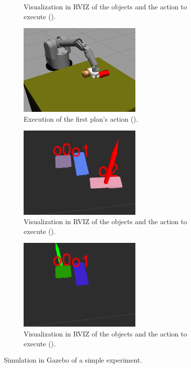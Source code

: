 \begin{figure}
\begin{subfigure}[h]{0.45\textwidth}
\caption{Visualization in RVIZ of the objects and the action to execute ().}
\label{fig:sim_rviz}
\end{subfigure}
\begin{subfigure}[h]{0.45\textwidth}
\centering
\includegraphics[width=6cm]{Img/simulation/pushing.png}
\caption{Execution of the first plan's action ().}\label{fig:sim_push}
\end{subfigure}
\begin{subfigure}[h]{0.45\textwidth}
\centering
\includegraphics[width=6cm]{Img/simulation/action2.png}
\caption{Visualization in RVIZ of the objects and the action to execute ().}\label{fig:action2}
\end{subfigure}
\begin{subfigure}[h]{0.45\textwidth}
\centering
\includegraphics[width=6cm]{Img/simulation/action3.png}
\caption{Visualization in RVIZ of the objects and the action to execute ().}\label{fig:action3}
\end{subfigure}
\caption{Simulation in Gazebo of a simple experiment.}\label{fig:simulation}
\end{figure}